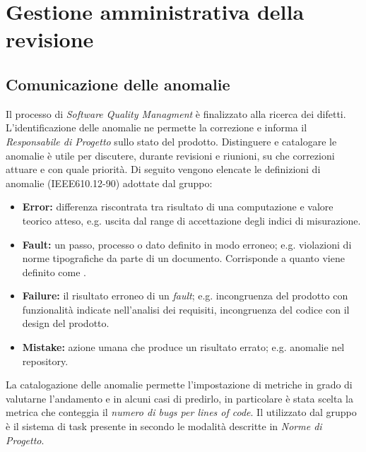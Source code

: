 \clearpage
\section{Gestione amministrativa della revisione}
	\subsection{Comunicazione delle anomalie}
	\label{DefinizioneAnomalie}
	Il processo di \emph{Software Quality Managment} è finalizzato alla ricerca dei difetti. L'identificazione delle anomalie ne permette la correzione e informa il \emph{Responsabile di Progetto} sullo stato del prodotto. Distinguere e catalogare le anomalie è utile per discutere, durante revisioni e riunioni, su che correzioni attuare e con quale priorità. Di seguito vengono elencate le definizioni di anomalie (IEEE610.12-90) adottate dal gruppo:
	\begin{itemize}
		\item \textbf{Error:} differenza riscontrata tra risultato di una computazione e valore teorico atteso, e.g. uscita dal range di accettazione degli indici di misurazione.
		\item \textbf{Fault:} un passo, processo o dato definito in modo erroneo; e.g. violazioni di norme tipografiche da parte di un documento. Corrisponde a quanto viene definito come .
		\item \textbf{Failure:} il risultato erroneo di un \emph{fault}; e.g. incongruenza del prodotto con funzionalità indicate nell'analisi dei requisiti, incongruenza del codice con il design del prodotto.
		\item \textbf{Mistake:} azione umana che produce un risultato errato; e.g. anomalie nel repository.
	\end{itemize}
	La catalogazione delle anomalie permette l'impostazione di metriche in grado di valutarne l'andamento e in alcuni casi di predirlo, in particolare è stata scelta la metrica che conteggia il \emph{numero di bugs per lines of code}. Il  utilizzato dal gruppo è il sistema di task presente in   secondo le modalità descritte in \emph{Norme di Progetto}.


